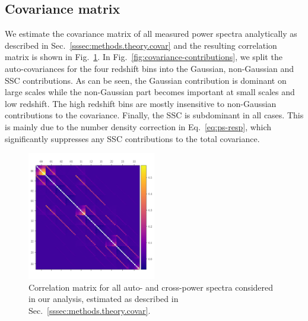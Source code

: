 \documentclass[a4paper,11pt]{article}
\begin{document}
  \subsection{Covariance matrix}\label{ssec:results.covariance}
    We estimate the covariance matrix of all measured power spectra analytically as described in Sec.~\ref{sssec:methods.theory.covar} and the resulting correlation matrix is shown in Fig.~\ref{fig:covmat}. In Fig.~\ref{fig:covariance-contributions}, we split the auto-covariances for the four redshift bins into the Gaussian, non-Gaussian and SSC contributions. As can be seen, the Gaussian contribution is dominant on large scales while the non-Gaussian part becomes important at small scales and low redshift. The high redshift bins are mostly insensitive to non-Gaussian contributions to the covariance. Finally, the SSC is subdominant in all cases. This is mainly due to the number density correction in Eq.~\ref{eq:ps-resp}, which significantly suppresses any SSC contributions to the total covariance.
    \begin{figure}
      \begin{center}
        \includegraphics[width=0.5\textwidth]{figures/covmat_HSC_dg_hoddg_hodxdg_hoddg_hod_trisp=4h3h2h_SSC=LINBIAS-resp_l=ells_eff_all_wcross_clfit=HOD-zevol_culled=True_coadd=area_G+NG+SSC.pdf}
        \caption{Correlation matrix for all auto- and cross-power spectra considered in our analysis, estimated as described in Sec.~\ref{sssec:methods.theory.covar}.}\label{fig:covmat}
      \end{center}
    \end{figure}
\end{document}
